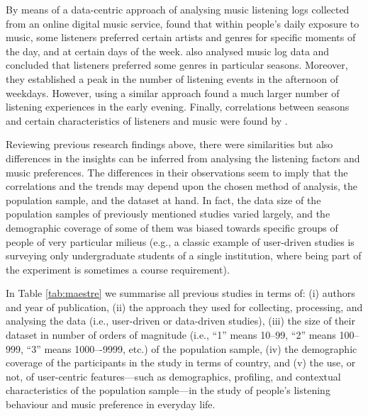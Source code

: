 \begin{description}
By means of a data-centric approach of analysing music listening logs collected from an online digital music service, \textcite{herrera10rocking} found that within people's daily exposure to music, some listeners preferred certain artists and genres for specific moments of the day, and at certain days of the week.
\textcite{park10temporal} also analysed music log data and concluded that listeners preferred some genres in particular seasons. Moreover, they established a peak in the number of listening events in the afternoon of weekdays. However, using a similar approach \textcite{buttgen10thesis} found a much larger number of listening experiences in the early evening. 
Finally, correlations between seasons and certain characteristics of listeners and music were found by \textcite{baur12listening}.
\end{description}

Reviewing previous research findings above, there were similarities but also differences in the insights can be inferred from analysing the listening factors and music preferences. The differences in their observations seem to imply that the correlations and the trends may depend upon the chosen method of analysis, the population sample, and the dataset at hand. 
In fact, the data size of the population samples of previously mentioned studies varied largely, and the demographic coverage of some of them was biased towards specific groups of people of very particular milieus (e.g., a classic example of user-driven studies is surveying only undergraduate students of a single institution, where being part of the experiment is sometimes a course requirement).



In Table \ref{tab:maestre} we summarise all previous studies in terms of: 
(i) authors and year of publication,
(ii) the approach they used for collecting, processing, and analysing the data (i.e., user-driven or data-driven studies), 
(iii) the size of their dataset in number of orders of magnitude (i.e., ``1'' means 10--99, ``2'' means 100--999, ``3'' means 1000–-9999, etc.) of the population sample, 
(iv) the demographic coverage of the participants in the study in terms of country, and 
(v) the use, or not, of user-centric features---such as demographics, profiling, and contextual characteristics of the population sample---in the study of people's listening behaviour and music preference in everyday life.


